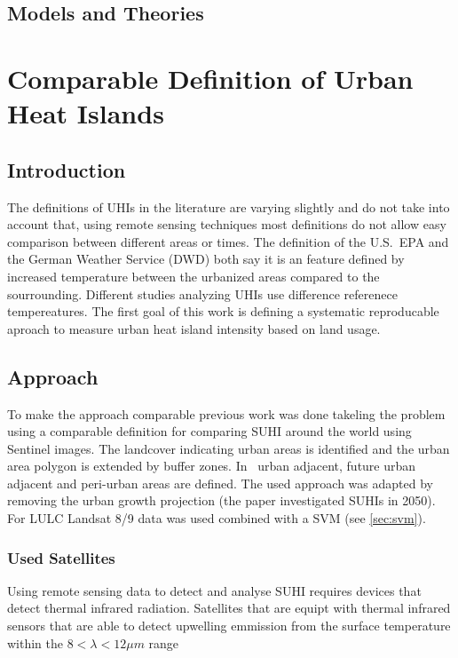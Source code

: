 \documentclass[a4paper, english]{article}
\begin{document}
    
    \subsection{Models and Theories}


\section{Comparable Definition of Urban Heat Islands}
    \subsection{Introduction}
    The definitions of \glspl{UHI} in the literature are varying slightly and do not take into account that, using remote sensing techniques most definitions do not allow easy comparison between different areas or times.
    The definition of the U.S.~EPA\cite{epaUHIDef} and the German Weather Service (DWD) both say it is an feature defined by increased temperature between the urbanized areas compared to the sourrounding. %
    Different studies analyzing \glspl{UHI} use difference referenece tempereatures.
    The first goal of this work is defining a systematic reproducable aproach to measure urban heat island intensity based on land usage.

    \subsection{Approach}
    To make the approach comparable previous work was done takeling the problem using a comparable definition for comparing \gls{SUHI} around the world using Sentinel images\cite{Sobrino2020}.
    The landcover indicating urban areas is identified and the urban area polygon is extended by buffer zones. 
    In~\cite{Sobrino2020} urban adjacent, future urban adjacent and peri-urban areas are defined.
    The used approach was adapted by removing the urban growth projection (the paper investigated \glspl{SUHI} in 2050).
    For \gls{LULC} Landsat 8/9 data was used combined with a SVM (see \cref{sec:svm}). 
    \subsubsection{Used Satellites}
    Using remote sensing data to detect and analyse \gls{SUHI} requires devices that detect thermal infrared radiation. 
    Satellites that are equipt with thermal infrared sensors that are able to detect upwelling emmission from the surface temperature within the $ 8 < \lambda < 12 \mu m $ range
    
\end{document}
